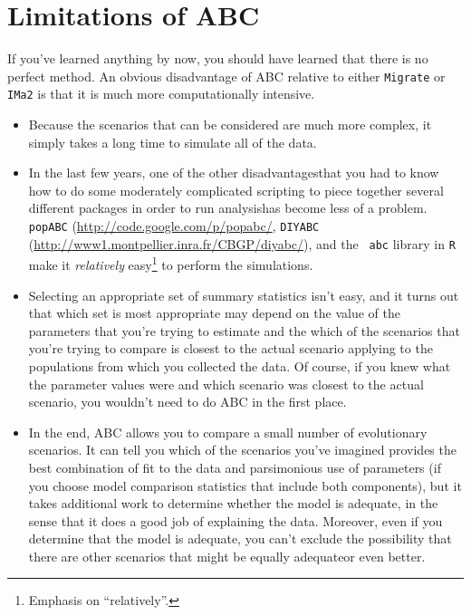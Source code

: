 \section*{Limitations of ABC}

If you've learned anything by now, you should have learned that there
is no perfect method. An obvious disadvantage of ABC relative to
either {\tt Migrate} or {\tt IMa2} is that it is much more
computationally intensive. 

\begin{itemize}

\item Because the scenarios that can be considered are much more
  complex, it simply takes a long time to simulate all of the data. 

\item In the last few years, one of the other disadvantages{\dash}that
  you had to know how to do some moderately complicated scripting to
  piece together several different packages in order to run
  analysis{\dash}has become less of a problem. {\tt popABC}
  (\url{http://code.google.com/p/popabc/}, {\tt DIYABC}
  (\url{http://www1.montpellier.inra.fr/CBGP/diyabc/}), and the {\tt
    abc\/} library in {\tt R} make it {\it relatively\/}
  easy\footnote{Emphasis on ``relatively''.} to perform the
  simulations.

\item Selecting an appropriate set of summary statistics isn't easy,
  and it turns out that which set is most appropriate may depend on
  the value of the parameters that you're trying to estimate and the
  which of the scenarios that you're trying to compare is closest to
  the actual scenario applying to the populations from which you
  collected the data. Of course, if you knew what the parameter values
  were and which scenario was closest to the actual scenario, you
  wouldn't need to do ABC in the first place.

\item In the end, ABC allows you to compare a small number of
  evolutionary scenarios. It can tell you which of the scenarios
  you've imagined provides the best combination of fit to the data and
  parsimonious use of parameters (if you choose model comparison
  statistics that include both components), but it takes additional
  work to determine whether the model is adequate, in the sense that
  it does a good job of explaining the data. Moreover, even if you
  determine that the model is adequate, you can't exclude the
  possibility that there are other scenarios that might be equally
  adequate{\dash}or even better.

\end{itemize}

